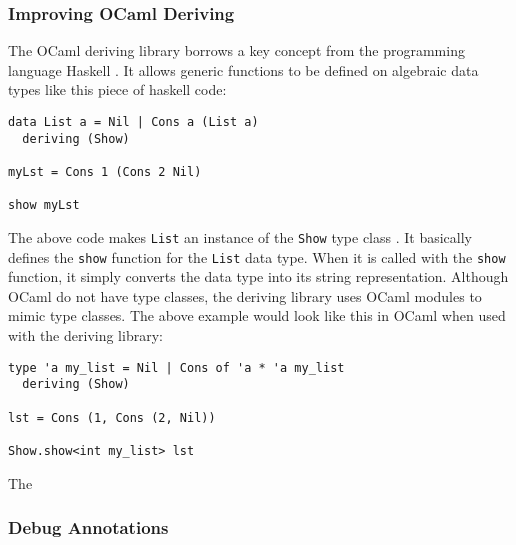 \documentclass[12pt,fullpage]{article}
\begin{document}
\subsubsection{Improving OCaml Deriving}

The OCaml deriving library borrows a key concept from the programming
language Haskell \cite{haskell98}. It allows generic functions to be
defined on algebraic data types like this piece of haskell code:
\begin{verbatim}
data List a = Nil | Cons a (List a)
  deriving (Show)

myLst = Cons 1 (Cons 2 Nil)

show myLst
\end{verbatim}
The above code makes \texttt{List} an instance of the \texttt{Show}
type class \cite{Hall96typeclasses} . It basically defines the
\texttt{show} function for the \texttt{List} data type. When it is
called with the \texttt{show} function, it simply converts the data
type into its string representation. Although OCaml do not have type
classes, the deriving library uses OCaml modules to mimic type
classes. The above example would look like this in OCaml when used
with the deriving library:
\begin{verbatim}
type 'a my_list = Nil | Cons of 'a * 'a my_list
  deriving (Show)

lst = Cons (1, Cons (2, Nil))

Show.show<int my_list> lst
\end{verbatim}
The
\subsubsection{Debug Annotations}
\end{document}
